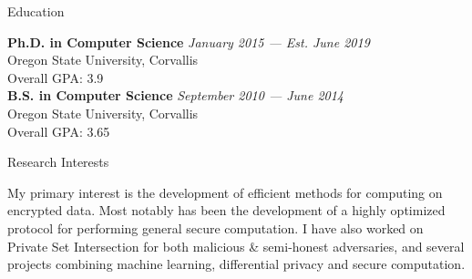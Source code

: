 \documentclass{resume} %
\begin{document}

\begin{rSection}{Education}

{\bf Ph.D. in Computer Science} \hfill {\em January 2015 --- Est. June 2019} \\ 
Oregon State University, Corvallis\smallskip \\
Overall GPA: 3.9\\ 

{\bf B.S. in Computer Science} \hfill {\em September 2010 --- June 2014} \\ 
Oregon State University, Corvallis\smallskip \\
Overall GPA: 3.65\\ 

\end{rSection}



\begin{rSection}{Research Interests}
	
My primary interest is the development of efficient methods for computing on encrypted data. Most notably has been the development of a highly optimized protocol for performing general secure computation. I have also worked on Private Set Intersection for both malicious \& semi-honest adversaries, and several projects combining machine learning, differential privacy and secure computation.
	
\end{rSection}

\end{document}
